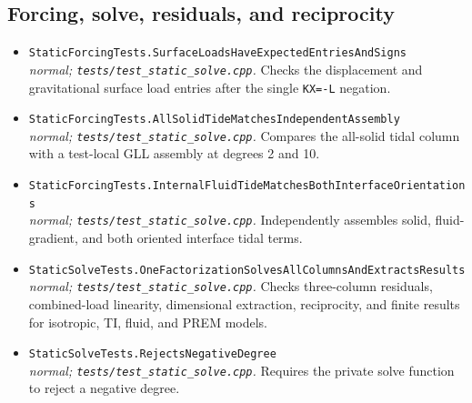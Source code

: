 \subsection*{Forcing, solve, residuals, and reciprocity}
\begin{itemize}[leftmargin=1.4em,itemsep=0.35em]
\item {\footnotesize\texttt{StaticForcingTests.SurfaceLoadsHaveExpectedEntriesAndSigns}}\\
\emph{normal; \texttt{tests/test\_static\_solve.cpp}.} Checks the displacement and gravitational surface load entries after the single \texttt{KX=-L} negation.
\item {\footnotesize\texttt{StaticForcingTests.AllSolidTideMatchesIndependentAssembly}}\\
\emph{normal; \texttt{tests/test\_static\_solve.cpp}.} Compares the all-solid tidal column with a test-local GLL assembly at degrees 2 and 10.
\item {\footnotesize\texttt{StaticForcingTests.InternalFluidTideMatchesBothInterfaceOrientations}}\\
\emph{normal; \texttt{tests/test\_static\_solve.cpp}.} Independently assembles solid, fluid-gradient, and both oriented interface tidal terms.
\item {\footnotesize\texttt{StaticSolveTests.OneFactorizationSolvesAllColumnsAndExtractsResults}}\\
\emph{normal; \texttt{tests/test\_static\_solve.cpp}.} Checks three-column residuals, combined-load linearity, dimensional extraction, reciprocity, and finite results for isotropic, TI, fluid, and PREM models.
\item {\footnotesize\texttt{StaticSolveTests.RejectsNegativeDegree}}\\
\emph{normal; \texttt{tests/test\_static\_solve.cpp}.} Requires the private solve function to reject a negative degree.
\end{itemize}
